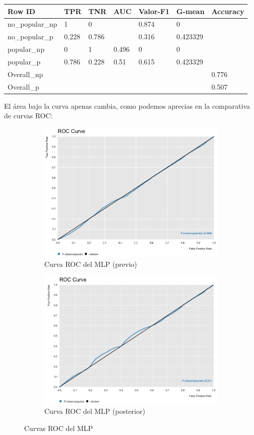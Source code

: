 \begin{table}[H]
	\centering
	\begin{tabular}{|l|l|l|l|l|l|l|}
		\hline
		Row ID          & TPR   & TNR   & AUC   & Valor-F1 & G-mean   & Accuracy \\ \hline
		no\_popular\_np & 1     & 0     &       & 0.874    & 0        &          \\ \hline
		no\_popular\_p  & 0.228 & 0.786 &       & 0.316    & 0.423329 &          \\ \hline
		popular\_np     & 0     & 1     & 0.496 & 0        & 0        &          \\ \hline
		popular\_p      & 0.786 & 0.228 & 0.51  & 0.615    & 0.423329 &          \\ \hline
		Overall\_np     &       &       &       &          &          & 0.776    \\ \hline
		Overall\_p      &       &       &       &          &          & 0.507    \\ \hline
	\end{tabular}
\end{table}

El área bajo la curva apenas cambia, como podemos aprecias en la comparativa de curvas ROC:

\begin{figure}[H]
	\begin{subfigure}{.5\textwidth}
		\centering
		\includegraphics[width=.4\linewidth]{roc-rn-p.png}
		\caption{Curva ROC del MLP (previo)}
		\label{fig:rcmlpp}
	\end{subfigure}%
	\begin{subfigure}{.5\textwidth}
		\centering
		\includegraphics[width=.4\linewidth]{roc-mlp.png}
		\caption{Curva ROC del MLP (posterior)}
		\label{fig:rcmlp}
	\end{subfigure}
	\caption{Curvas ROC del MLP}
	\label{fig:mlp}
\end{figure}

